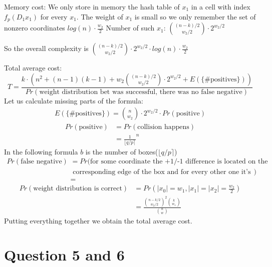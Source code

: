 \documentclass[12pt]{article}
\begin{document}
Memory cost:
We only store in memory the hash table of $x_1$ in a cell with index $f_{p}(D_1x_1)$ for every $x_1$.
The weight of $x_1$ is small so we only remember the set of nonzero coordinates $log(n) \cdot \frac{w_2}{2}$ Number of such $x_1$: $\binom{(n-k)/2}{w_2/2} \cdot 2^{w_2/2}$

So the overall complexity is  $\binom{(n-k)/2}{w_2/2} \cdot 2^{w_2/2} \cdot log(n) \cdot \frac{w_2}{2}$

Total average cost:
\[
    T = \frac{k \cdot (n^2 + (n-1)(k-1) + w_2\binom{(n-k)/2}{w_2/2} \cdot 2^{w_2/2} + E(\{\text{\# positives}\}))}{Pr(\text{weight distribution bet was successful, there was no false negative})}
\]
Let us calculate missing parts of the formula:
\[
\begin{split}
    E(\{\text{\# positives}\}) = \binom{n}{w_2} \cdot 2^{w_2/2} \cdot Pr(\text{positive})
\end{split}
\]
\[
\begin{split}
    Pr(\text{positive}) & = Pr(\text{collision happens}) \\
    & = \frac{1}{\lfloor q/p \rceil}^{n}
\end{split}
\]
In the following formula $b$ is the number of boxes($\lfloor q/p \rceil$)
\[
\begin{split}
    Pr(\text{false negative}) & = Pr(\text{for some coordinate the +1/-1 difference is located on the} \\
    & \text{ corresponding edge of the box and for every other one it's still +1/-1}) \\
    & =
\end{split}
\]
\[
\begin{split}
    Pr(\text{weight distribution is correct}) & = Pr(|x_0| = w_1, |x_1| = |x_2| = \frac{w_2}{2}) \\
    & = \frac{\binom{n-k/2}{w_2/2}^{2}\binom{k}{w_1}}{\binom{n}{w}}
\end{split}
\]
Putting everything together we obtain the total average cost.

\section{Question 5 and 6}




\end{document}
